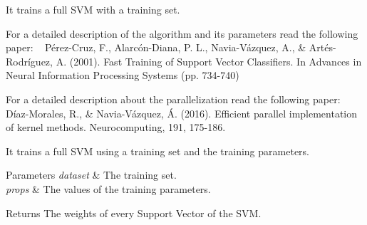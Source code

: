 It trains a full S\+VM with a training set. 

For a detailed description of the algorithm and its parameters read the following paper\+: ~\newline
 Pérez-\/\+Cruz, F., Alarcón-\/\+Diana, P. L., Navia-\/\+Vázquez, A., \& Artés-\/\+Rodríguez, A. (2001). Fast Training of Support Vector Classifiers. In Advances in Neural Information Processing Systems (pp. 734-\/740)

For a detailed description about the parallelization read the following paper\+: ~\newline
Díaz-\/\+Morales, R., \& Navia-\/\+Vázquez, Á. (2016). Efficient parallel implementation of kernel methods. Neurocomputing, 191, 175-\/186.

It trains a full S\+VM using a training set and the training parameters. 
\begin{DoxyParams}{Parameters}
{\em dataset} & The training set. \\
\hline
{\em props} & The values of the training parameters. \\
\hline
\end{DoxyParams}
\begin{DoxyReturn}{Returns}
The weights of every Support Vector of the S\+VM. 
\end{DoxyReturn}
